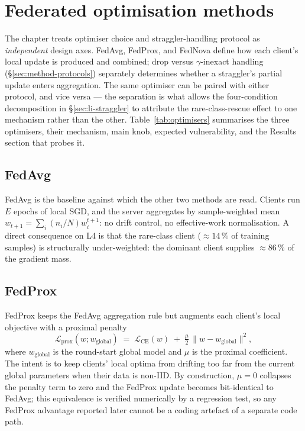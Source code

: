 \documentclass[11pt,a4paper]{report}
\begin{document}
\section{Federated optimisation methods}
\label{sec:method-optimisers}

The chapter treats optimiser choice and straggler-handling protocol as
\emph{independent} design axes. FedAvg, FedProx, and FedNova define how
each client's local update is produced and combined; drop versus
$\gamma$-inexact handling (§\ref{sec:method-protocols}) separately
determines whether a straggler's partial update enters aggregation. The
same optimiser can be paired with either protocol, and vice versa ---
the separation is what allows the four-condition decomposition in
§\ref{sec:li-straggler} to attribute the rare-class-rescue effect to
one mechanism rather than the other. Table~\ref{tab:optimisers}
summarises the three optimisers, their mechanism, main knob, expected
vulnerability, and the Results section that probes it.

\subsection{FedAvg}

FedAvg \citep{mcmahan2017fedavg} is the baseline against which the other
two methods are read. Clients run $E$ epochs of local SGD, and the server
aggregates by sample-weighted mean $w_{t+1} = \sum_i (n_i / N) w_i^{t+1}$:
no drift control, no effective-work normalisation. A direct consequence
on L4 is that the rare-class client ($\approx 14\,\%$ of training
samples) is structurally under-weighted: the dominant client supplies
$\approx 86\,\%$ of the gradient mass.

\subsection{FedProx}

FedProx \citep{li2020fedprox} keeps the FedAvg aggregation rule but
augments each client's local objective with a proximal penalty
\[
  \mathcal{L}_{\textrm{prox}}(w; w_{\textrm{global}})
  \;=\; \mathcal{L}_{\textrm{CE}}(w) \;+\; \tfrac{\mu}{2}\,
        \lVert w - w_{\textrm{global}} \rVert^{2},
\]
where $w_{\textrm{global}}$ is the round-start global model and $\mu$ is
the proximal coefficient. The intent is to keep clients' local optima
from drifting too far from the current global parameters when their
data is non-IID. By construction, $\mu = 0$ collapses the penalty term
to zero and the FedProx update becomes bit-identical to FedAvg; this
equivalence is verified numerically by a regression test, so any FedProx
advantage reported later cannot be a coding artefact of a separate code
path.
\end{document}

